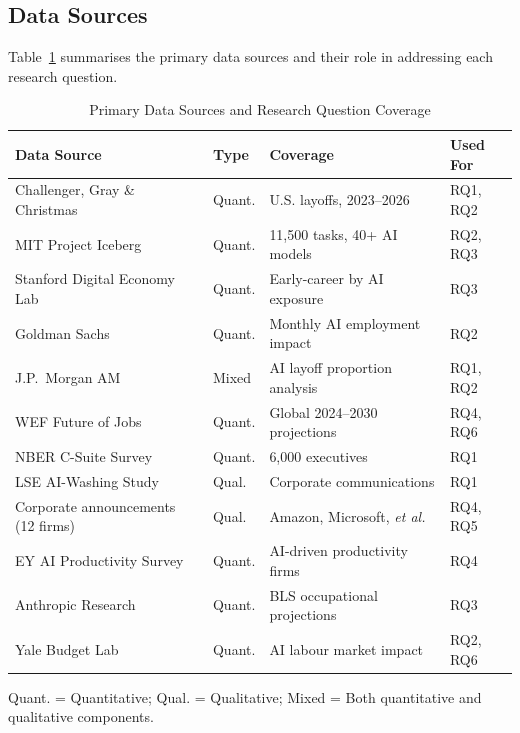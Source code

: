 \documentclass[12pt, a4paper]{article}
\begin{document}
\subsection{Data Sources}

Table~\ref{tab:datasources} summarises the primary data sources and their role in addressing
each research question.

\begin{table}[H]
\centering
\caption{Primary Data Sources and Research Question Coverage}
\label{tab:datasources}
\small
\begin{threeparttable}
\begin{tabularx}{\textwidth}{@{}lllX@{}}
\toprule
\textbf{Data Source} & \textbf{Type} & \textbf{Coverage} & \textbf{Used For} \\
\midrule
Challenger, Gray \& Christmas \citep{challenger2025} & Quant. & U.S. layoffs, 2023--2026 & RQ1, RQ2 \\
MIT Project Iceberg \citep{mit2025}                  & Quant. & 11,500 tasks, 40+ AI models & RQ2, RQ3 \\
Stanford Digital Economy Lab \citep{brynjolfsson2025} & Quant. & Early-career by AI exposure & RQ3 \\
Goldman Sachs \citep{goldmansachs2025}               & Quant. & Monthly AI employment impact & RQ2 \\
J.P.\ Morgan AM \citep{jpmorgan2025}                  & Mixed  & AI layoff proportion analysis & RQ1, RQ2 \\
WEF Future of Jobs \citep{wef2025}                   & Quant. & Global 2024--2030 projections & RQ4, RQ6 \\
NBER C-Suite Survey \citep{nber2025}                 & Quant. & 6,000 executives & RQ1 \\
LSE AI-Washing Study \citep{lse2025}                 & Qual.  & Corporate communications & RQ1 \\
Corporate announcements (12 firms)                   & Qual.  & Amazon, Microsoft, \textit{et al.} & RQ4, RQ5 \\
EY AI Productivity Survey \citep{ey2025}             & Quant. & AI-driven productivity firms & RQ4 \\
Anthropic Research \citep{anthropic2026}             & Quant. & BLS occupational projections & RQ3 \\
Yale Budget Lab \citep{yalebudgetlab2025}            & Quant. & AI labour market impact & RQ2, RQ6 \\
\bottomrule
\end{tabularx}
\begin{tablenotes}
\small\item Quant. = Quantitative; Qual. = Qualitative; Mixed = Both quantitative and qualitative components.
\end{tablenotes}
\end{threeparttable}
\end{table}
\end{document}
